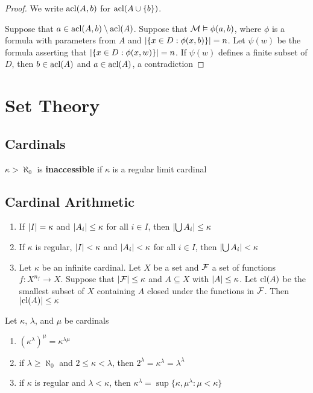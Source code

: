 \documentclass[11pt]{article}
\begin{document}
\begin{proof}
We write \(\text{acl}(A,b)\) for \(\text{acl}(A\cup\{b\})\).

Suppose that \(a\in\text{acl}(A,b)\setminus\text{acl}(A)\). Suppose that \(\mathcal{M}\vDash\phi(a,b)\), where \(\phi\) is a formula with
parameters from \(A\) and \(\abs{\{x\in D:\phi(x,b)\}}=n\). Let \(\psi(w)\) be the formula asserting
that \(\abs{\{x\in D:\phi(x,w)\}}=n\). If \(\psi(w)\) defines a finite subset of \(D\),
then \(b\in\text{acl}(A)\)
and \(a\in\text{acl}(A)\), a contradiction
\end{proof}

\appendix
\section{Set Theory}
\label{sec:org36ebae5}
\subsection{Cardinals}
\label{sec:org4aaa660}
\(\kappa>\aleph_0\) is \textbf{inaccessible} if \(\kappa\) is a regular limit cardinal
\subsection{Cardinal Arithmetic}
\label{sec:org828d975}
\begin{corollary}[]
\label{corA.15} 
\begin{enumerate}
\item If \(\abs{I}=\kappa\) and \(\abs{A_i}\le\kappa\) for all \(i\in I\), then 
\(\abs{\bigcup A_i}\le\kappa\)
\item If \(\kappa\) is regular, \(\abs{I}<\kappa\) and \(\abs{A_i}<\kappa\) for all 
\(i\in I\), then \(\abs{\bigcup A_i}<\kappa\)
\item Let \(\kappa\) be an infinite cardinal. Let \(X\) be a set and \(\mathcal{F}\) a set of
functions \(f:X^{n_f}\to X\). Suppose that \(\abs{\calf}\le\kappa\) and
\(A\subseteq X\) with \(\abs{A}\le\kappa\). Let \(\operatorname{\text{cl}}(A)\) be the smallest
subset of \(X\) containing \(A\) closed under the functions in \(\mathcal{F}\). Then 
\(\abs{\cl(A)}\le\kappa\)
\end{enumerate}
\end{corollary}

\begin{lemma}[]
Let \(\kappa\), \(\lambda\), and \(\mu\) be cardinals
\begin{enumerate}
\item \((\kappa^\lambda)^\mu=\kappa^{\lambda\mu}\)
\item if \(\lambda\ge\aleph_0\) and \(2\le\kappa<\lambda\), then \(2^\lambda=\kappa^\lambda=\lambda^\lambda\)
\item if \(\kappa\) is regular and \(\lambda<\kappa\), then \(\kappa^\lambda=\sup\{\kappa,\mu^\lambda:\mu<\kappa\}\)
\end{enumerate}
\end{lemma}
\end{document}
